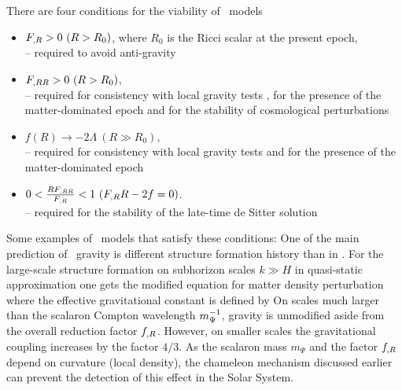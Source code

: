 There are four conditions for the viability of \fR\ models \parencite{Amendola_2007}
\begin{itemize}
	\item $F_{,R}>0\ (R>R_0)$, where $R_0$ is the Ricci scalar at the present epoch,\\
	-- required to avoid anti-gravity \parencite{2010deto.book.....A}\\
	\item $F_{,RR}>0\ (R>R_0)$,\\
	-- required for consistency with local gravity tests \parencite{2005gr.qc.....5136O}, for the presence of the matter-dominated epoch \parencite{2007PhRvL..98m1302A} and for the stability of cosmological perturbations \parencite{2007PhRvD..75d4004S}\\
	\item $f(R)\rightarrow -2\Lambda\ (R\gg R_0)$,\\
	-- required for consistency with local gravity tests \parencite{2008PhRvD..77b3507T} and for the presence of the matter-dominated epoch \parencite{Amendola_2007}\\
	\item $0<\frac{RF_{,RR}}{F_{,R}}<1\ (F_{,R} R-2f=0)$.\\
	-- required for the stability of the late-time de Sitter solution \parencite{1988PhLB..202..198M}
\end{itemize}
Some examples of \fR\ models that satisfy these conditions:
One of the main prediction of \fR\ gravity is different structure formation history than in \LCDM. For the large-scale structure formation on subhorizon scales \mbox{$k\gg H$} in quasi-static approximation one gets the modified equation for matter density perturbation \cite{2011RSPTA.369.4947B}
where the effective gravitational constant is defined by
On scales much larger than the scalaron Compton wavelength $m_\Psi^{-1}$, gravity is unmodified aside from the overall reduction factor $f_{,R}$. However, on smaller scales the gravitational coupling increases by the factor $4/3$. As the scalaron mass $m_\Psi$ and the factor $f_{,R}$ depend on curvature (local density), the chameleon mechanism discussed earlier can prevent the detection of this effect in the Solar System.

